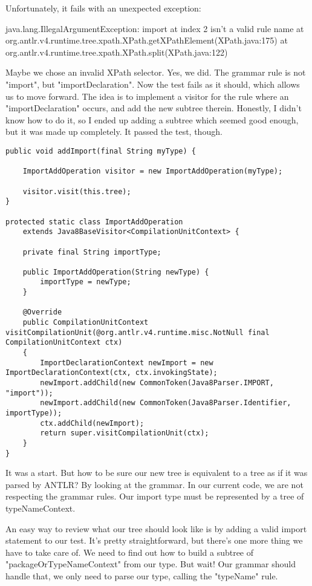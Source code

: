 \documentclass[11pt]{article}
\begin{document}
Unfortunately, it fails with an unexpected exception:

java.lang.IllegalArgumentException: import at index 2 isn't a valid rule name
    at org.antlr.v4.runtime.tree.xpath.XPath.getXPathElement(XPath.java:175)
    at org.antlr.v4.runtime.tree.xpath.XPath.split(XPath.java:122)

Maybe we chose an invalid XPath selector. Yes, we did. The grammar rule is not "import", but "importDeclaration".
Now the test fails as it should, which allows us to move forward. The idea is to implement a visitor for the rule where
an "importDeclaration" occurs, and add the new subtree therein. Honestly, I didn't know how to do it, so I ended up
adding a subtree which seemed good enough, but it was made up completely. It passed the test, though.

\begin{verbatim}
public void addImport(final String myType) {

    ImportAddOperation visitor = new ImportAddOperation(myType);

    visitor.visit(this.tree);
}

protected static class ImportAddOperation
    extends Java8BaseVisitor<CompilationUnitContext> {

    private final String importType;

    public ImportAddOperation(String newType) {
        importType = newType;
    }

    @Override
    public CompilationUnitContext visitCompilationUnit(@org.antlr.v4.runtime.misc.NotNull final CompilationUnitContext ctx)
    {
        ImportDeclarationContext newImport = new ImportDeclarationContext(ctx, ctx.invokingState);
        newImport.addChild(new CommonToken(Java8Parser.IMPORT, "import"));
        newImport.addChild(new CommonToken(Java8Parser.Identifier, importType));
        ctx.addChild(newImport);
        return super.visitCompilationUnit(ctx);
    }
}
\end{verbatim}

It was a start. But how to be sure our new tree is equivalent to a tree as if it was parsed by ANTLR? By looking at the grammar.
In our current code, we are not respecting the grammar rules. Our import type must be represented by a tree of typeNameContext.

An easy way to review what our tree should look like is by adding a valid import statement to our test. It's pretty straightforward,
but there's one more thing we have to take care of. We need to find out how to build a subtree of "packageOrTypeNameContext" from our type.
But wait! Our grammar should handle that, we only need to parse our type, calling the "typeName" rule.
\end{document}
